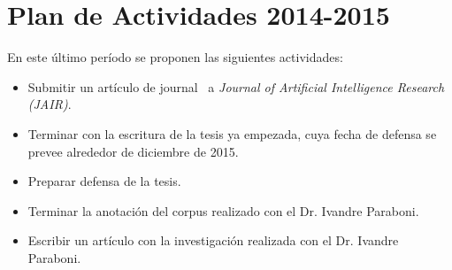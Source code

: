 \section{Plan de Actividades 2014-2015}
\label{plandetrabajo}

En este \'ultimo per\'iodo se proponen las siguientes actividades:

\begin{itemize}

\item Submitir un art\'iculo de journal~\cite{benotti-altamirano-jair} a \emph{Journal of Artificial Intelligence Research (JAIR)}.
\item Terminar con la escritura de la tesis ya empezada, cuya fecha de defensa se prevee alrededor de diciembre de 2015.
\item Preparar defensa de la tesis.
\item Terminar la anotaci\'on del corpus realizado con el Dr. Ivandre Paraboni.
\item Escribir un art\'iculo con la investigaci\'on realizada con el Dr. Ivandre Paraboni.

\end{itemize}

